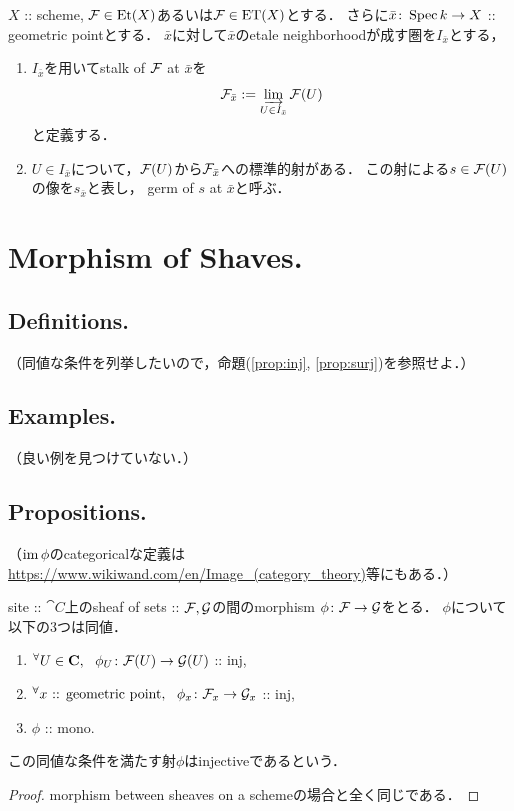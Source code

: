\documentclass[a4paper, dvipdfmx]{jsarticle}
\begin{document}
\begin{Def}
    $X$ :: scheme,
    $\mathcal{F} \in \mathrm{Et}(X)$あるいは$\mathcal{F} \in \mathrm{ET}(X)$とする．
    さらに$\bar{x} \colon \operatorname{Spec} k \to X$ :: geometric pointとする．
    $\bar{x}$に対して$\bar{x}$のetale neighborhoodが成す圏を$I_{\bar{x}}$とする，

    \begin{enumerate}[label=(\roman*)]
        \item 
        $I_{\bar{x}}$を用いてstalk of $\mathcal{F}$ at $\bar{x}$を
        \[ \mathcal{F}_{\bar{x}}:=\varinjlim_{U \in I_{\bar{x}}} \mathcal{F}(U) \]
        と定義する．

        \item
        $U \in I_{\bar{x}}$について，$\mathcal{F}(U)$から$\mathcal{F}_{\bar{x}}$への標準的射がある．
        この射による$s \in \mathcal{F}(U)$の像を$s_{\bar{x}}$と表し，
        germ of $s$ at $\bar{x}$と呼ぶ．
    \end{enumerate}
\end{Def}

\section{Morphism of Shaves.}
\subsection{Definitions.}
\begin{Def}
    （同値な条件を列挙したいので，命題(\ref{prop:inj}, \ref{prop:surj})を参照せよ．）
\end{Def}

\subsection{Examples.}
（良い例を見つけていない．）

\subsection{Propositions.}
\begin{Def}
    （$\operatorname{im} \phi$のcategoricalな定義は\url{https://www.wikiwand.com/en/Image_(category_theory)}等にもある．）
\end{Def}

\begin{Prop} \label{prop:inj}
    site :: $\cat{C}$上のsheaf of sets :: $\mathcal{F}, \mathcal{G}$の間のmorphism
    $\phi \colon \mathcal{F} \to \mathcal{G}$をとる．
    $\phi$について以下の$3$つは同値．
    \begin{enumerate}
        \item ${}^{\forall} U \in \mathbf{C},~~ \phi_{U} \colon \mathcal{F}(U) \to \mathcal{G}(U)$ :: inj,
        \item ${}^{\forall} x \text{ :: geometric point},~~ \phi_{x} \colon \mathcal{F}_x \to \mathcal{G}_x$ :: inj,
        \item $\phi$ :: mono.
    \end{enumerate}
    この同値な条件を満たす射$\phi$はinjectiveであるという．
\end{Prop}
\begin{proof}
    morphism between sheaves on a schemeの場合と全く同じである．
\end{proof}
\end{document}
